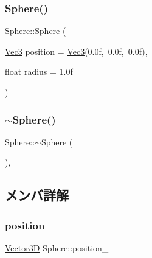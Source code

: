 \subsubsection{\texorpdfstring{Sphere()}{Sphere()}}
{\footnotesize\ttfamily Sphere\+::\+Sphere (\begin{DoxyParamCaption}\item[{\mbox{\hyperlink{_vector3_d_8h_ab16f59e4393f29a01ec8b9bbbabbe65d}{Vec3}}}]{position = {\ttfamily \mbox{\hyperlink{_vector3_d_8h_ab16f59e4393f29a01ec8b9bbbabbe65d}{Vec3}}(0.0f,~0.0f,~0.0f)},  }\item[{float}]{radius = {\ttfamily 1.0f} }\end{DoxyParamCaption})\hspace{0.3cm}{\ttfamily [inline]}}

\mbox{\label{class_sphere_a569c071e50a3e11f678630ee1a17737e}} 
\subsubsection{\texorpdfstring{$\sim$\+Sphere()}{~Sphere()}}
{\footnotesize\ttfamily Sphere\+::$\sim$\+Sphere (\begin{DoxyParamCaption}{ }\end{DoxyParamCaption})\hspace{0.3cm}{\ttfamily [inline]}, {\ttfamily [virtual]}}



\subsection{メンバ詳解}
\mbox{\label{class_sphere_a5a18bfcc7abcdfbd6802ec622dfa5590}} 
\subsubsection{\texorpdfstring{position\+\_\+}{position\_}}
{\footnotesize\ttfamily \mbox{\hyperlink{class_vector3_d}{Vector3D}} Sphere\+::position\+\_\+}

\mbox{\label{class_sphere_ac2924d9ad22bfad1ed1914c069c188dc}} 
